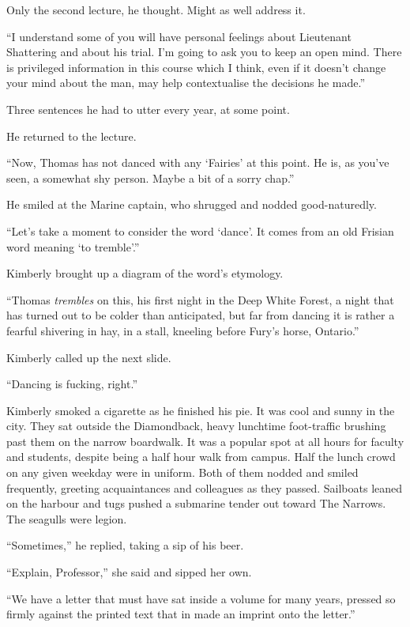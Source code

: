\documentclass[11pt,a5paper]{article}
\begin{document}
Only the second lecture, he thought. Might as well address it.

``I understand some of you will have personal feelings about Lieutenant Shattering and about his trial. I'm going to ask you to keep an open mind. There is privileged information in this course which I think, even if it doesn't change your mind about the man, may help contextualise the decisions he made.''

Three sentences he had to utter every year, at some point.

He returned to the lecture.

``Now, Thomas has not danced with any `Fairies' at this point. He is, as you've seen, a somewhat shy person. Maybe a bit of a sorry chap.''

He smiled at the Marine captain, who shrugged and nodded good-naturedly.

``Let's take a moment to consider the word `dance'. It comes from an old Frisian word meaning `to tremble'.''

Kimberly brought up a diagram of the word's etymology.

``Thomas \emph{trembles} on this, his first night in the Deep White Forest, a night that has turned out to be colder than anticipated, but far from dancing it is rather a fearful shivering in hay, in a stall, kneeling before Fury's horse, Ontario.''

Kimberly called up the next slide.

\vspace{1em}

``Dancing is fucking, right.''

Kimberly smoked a cigarette as he finished his pie. It was cool and sunny in the city. They sat outside the Diamondback, heavy lunchtime foot-traffic brushing past them on the narrow boardwalk. It was a popular spot at all hours for faculty and students, despite being a half hour walk from campus. Half the lunch crowd on any given weekday were in uniform. Both of them nodded and smiled frequently, greeting acquaintances and colleagues as they passed. Sailboats leaned on the harbour and tugs pushed a submarine tender out toward The Narrows. The seagulls were legion.

``Sometimes,'' he replied, taking a sip of his beer.

``Explain, Professor,'' she said and sipped her own.

``We have a letter that must have sat inside a volume for many years, pressed so firmly against the printed text that in made an imprint onto the letter.''
\end{document}
